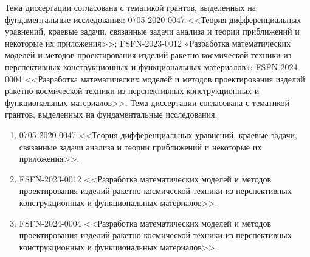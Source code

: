 \ifsynopsis
Тема диссертации согласована с тематикой грантов, выделенных на фундаментальные исследования: 0705-2020-0047 <<Теория дифференциальных уравнений, краевые задачи, связанные задачи анализа и теории приближений и некоторые их приложения>>; FSFN-2023-0012 «Разработка математических моделей и методов проектирования изделий ракетно-космической техники из перспективных конструкционных и функциональных материалов»; FSFN-2024-0004 <<Разработка математических моделей и методов проектирования изделий ракетно-космической техники из перспективных конструкционных и функциональных материалов>>.
\else
Тема диссертации согласована с тематикой грантов, выделенных на фундаментальные исследования.
\begin{enumerate}
	\item 0705-2020-0047 <<Теория дифференциальных уравнений, краевые задачи, связанные задачи анализа и теории приближений и некоторые их приложения>>.
	\item FSFN-2023-0012 <<Разработка математических моделей и методов проектирования изделий ракетно-космической техники из перспективных конструкционных и функциональных материалов>>.
	\item FSFN-2024-0004 <<Разработка математических моделей и методов проектирования изделий ракетно-космической техники из перспективных конструкционных и функциональных материалов>>.
\end{enumerate}
\fi

